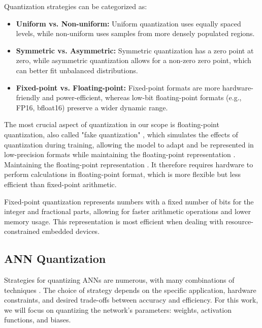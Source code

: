Quantization strategies can be categorized as:
\begin{itemize}
    \item \textbf{Uniform vs. Non-uniform:} Uniform quantization uses equally spaced levels, while non-uniform uses samples from more densely populated regions.
    \item \textbf{Symmetric vs. Asymmetric:} Symmetric quantization has a zero point at zero, while asymmetric quantization allows for a non-zero zero point, which can better fit unbalanced distributions.
    \item \textbf{Fixed-point vs. Floating-point:} Fixed-point formats are more hardware-friendly and power-efficient, whereas low-bit floating-point formats (e.g., FP16, bfloat16) preserve a wider dynamic range.
\end{itemize}

The most crucial aspect of quantization in our scope is floating-point quantization, also called "fake quantization" \cite{gholami2021surveyquantizationmethodsefficient}, which simulates the effects of quantization during training, allowing the model to adapt and be represented in low-precision formats while maintaining the floating-point representation \cite{gholami2021surveyquantizationmethodsefficient}. Maintaining the floating-point representation \cite{gholami2021surveyquantizationmethodsefficient}. It therefore requires hardware to perform calculations in floating-point format, which is more flexible but less efficient than fixed-point arithmetic.

Fixed-point quantization represents numbers with a fixed number of bits for the integer and fractional parts, allowing for faster arithmetic operations and lower memory usage. This representation is most efficient when dealing with resource-constrained embedded devices\cite{sena2021verifying,gholami2021surveyquantizationmethodsefficient, huangEfficientVerificationQuantized2023}.

\subsection{ANN Quantization}

Strategies for quantizing ANNs are numerous, with many combinations of techniques \cite{jacob2018quantization, gholami2021surveyquantizationmethodsefficient}. The choice of strategy depends on the specific application, hardware constraints, and desired trade-offs between accuracy and efficiency. For this work, we will focus on quantizing the network’s parameters: weights, activation functions, and biases.


